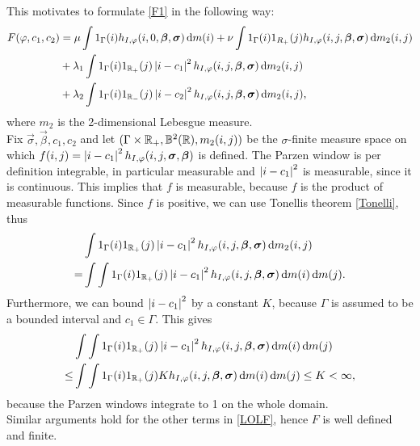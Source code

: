 This motivates to formulate \eqref{F1} in the following way:
\begin{equation}
  \begin{split}
    F(\phi,c_1,c_2) &= \mu \int 1_\Gamma(i) h_{I,\phi}(i,0,\vec{\beta},\vec{\sigma})\df m(i) + \nu\int 1_{\Gamma}(i)1_{R_+}(j) h_{I,\phi}(i,j,\vec{\beta},\vec{\sigma})\df m_2(i,j)\\
    &+ \lambda_1\int 1_\Gamma(i) 1_{\R_+}(j) \abs{i-c_1}^2h_{I,\phi}(i,j,\vec{\beta},\vec{\sigma})\df m_2(i, j)\\
    &+ \lambda_2\int 1_\Gamma(i) 1_{\R_-}(j) \abs{i-c_2}^2h_{I,\phi}(i,j,\vec{\beta},\vec{\sigma})\df m_2(i, j),
  \end{split}\label{LOLF}
\end{equation}
where $m_2$ is the 2-dimensional Lebesgue measure.\\
Fix $\vec{\sigma}, \vec{\beta}, c_1, c_2$ and let $(\Gamma\times \mathbb R_+,\mathbb{B}^2(\mathbb R),m_2(i,j))$ be the $\sigma$-finite measure space on which $f(i,j) = \left| {i-c_1} \right|^2h_{I,\varphi}(i,j,\boldsymbol{\sigma} ,\boldsymbol{\beta} )$ is defined. The Parzen window is per definition integrable, in particular measurable and $\left| {i-c_1} \right|^2$ is measurable, since it is continuous. This implies that $f$ is measurable, because $f$ is the product of measurable functions. Since $f$ is positive, we can use Tonellis theorem \eqref{Tonelli}, thus
\begin{equation}
  \begin{split}
    &\int 1_\Gamma(i) 1_{\mathbb R_+}(j) \left| {i-c_1} \right|^2h_{I,\varphi}(i,j,\boldsymbol{\beta} ,\boldsymbol{\sigma} )\,{\rm d} m_2(i, j)\\
    = &\int\int 1_\Gamma(i) 1_{\mathbb R_+}(j) \left| {i-c_1} \right|^2h_{I,\varphi}(i,j,\boldsymbol{\beta} ,\boldsymbol{\sigma} )\,{\rm d} m(i) \,{\rm d} m(j).
  \end{split}
\end{equation}
Furthermore, we can bound $\left| {i-c_1} \right|^2$ by a constant $K$, because $\Gamma$ is assumed to be a bounded interval and $c_1\in\Gamma$. This gives
\begin{equation}
  \begin{split}
    &\int\int 1_\Gamma(i) 1_{\mathbb R_+}(j) \left| {i-c_1} \right|^2h_{I,\varphi}(i,j,\boldsymbol{\beta} ,\boldsymbol{\sigma} )\,{\rm d} m(i) \,{\rm d} m(j)\\
    \leq &\int\int 1_\Gamma(i) 1_{\mathbb R_+}(j) K h_{I,\varphi}(i,j,\boldsymbol{\beta} ,\boldsymbol{\sigma} )\,{\rm d} m(i) \,{\rm d} m(j) \leq K < \infty,
  \end{split}
\end{equation}
because the Parzen windows integrate to 1 on the whole domain.\\
Similar arguments hold for the other terms in \eqref{LOLF}, hence $F$ is well defined and finite.\\

